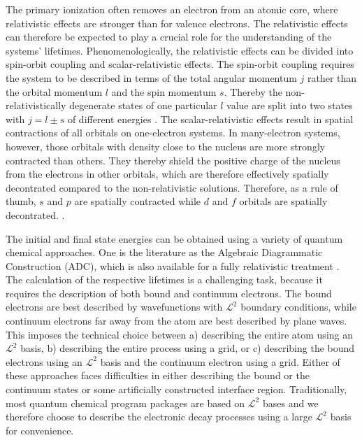 \documentclass[aps,amssymb,preprint,a4paper,longbibliography]{revtex4}
\begin{document}
The primary ionization often removes an electron from an atomic core, where
relativistic effects are stronger than for valence electrons. The relativistic
effects can therefore be expected to play a crucial role for the understanding
of the systems' lifetimes.
Phenomenologically, the relativistic effects can be divided  
into spin-orbit coupling and scalar-relativistic effects. The spin-orbit       
coupling requires the system to be described in terms of the total angular     
momentum $j$ rather than the orbital momentum $l$ and the spin momentum $s$.   
Thereby the non-relativistically degenerate states of one particular $l$       
value are split into two states with $j=l\pm s$ of different energies          
\cite{ReiherWolf09}.                                            
The scalar-relativistic effects result in spatial contractions of all orbitals on
one-electron systems. In many-electron systems, however, those orbitals with density close
to the nucleus are more strongly contracted than others. They thereby
shield the positive charge of the nucleus from the electrons in other orbitals,
which are therefore effectively spatially decontrated compared to the non-relativistic
solutions. Therefore, as a rule of thumb, $s$ and $p$ are spatially contracted while
$d$ and $f$ orbitals are spatially decontrated. \cite{ReiherWolf09}.

The initial and final state energies can be obtained using      
a variety of quantum chemical approaches.
{
One is the literature as the       
Algebraic Diagrammatic Construction \cite{Schirmer_book,Schirmer82_1,Schirmer83,Schirmer91,Schirmer98, 
Mertins96_1}} (ADC), which is also                               
available for a fully relativistic treatment                    
\cite{Pernpointner04_1,Pernpointner04_2,Pernpointner10_1}.
The calculation of the respective lifetimes is a challenging task, because it
requires the description of both bound and continuum electrons. The bound electrons
are best described by wavefunctions with $\mathcal{L}^2$ boundary conditions,
while continuum electrons far away from the atom are best described by
plane waves. This imposes the technical choice between a) describing the entire
atom using an $\mathcal{L}^2$ basis, b) describing the entire process using
a grid, or c) describing the bound electrons using an $\mathcal{L}^2$ basis
and the continuum electron using a grid.
Either     
of these approaches faces difficulties in either describing the bound or the  
continuum states or some artificially constructed interface region.
Traditionally, most quantum
chemical program packages are based on $\mathcal{L}^2$ bases and we therefore
choose to describe the electronic decay processes using a large $\mathcal{L}^2$
basis for convenience.
\end{document}
